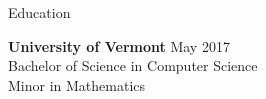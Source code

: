 \documentclass{resume} %
\begin{document}

\begin{rSection}{Education}

{\bf University of Vermont} \hfill {May 2017} \\ 
Bachelor of Science in Computer Science \\
Minor in Mathematics
\end{rSection}

\end{document}
